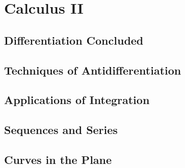 \part{Calculus II}

\clearpage{\pagestyle{empty}\cleardoublepage}
\chapter{Differentiation Concluded}\label{chapter:diff_conc}
\thispagestyle{empty}







\clearpage{\pagestyle{empty}\cleardoublepage}
\chapter{Techniques of Antidifferentiation}\label{chapter:anti_tech}
\thispagestyle{empty}







\clearpage{\pagestyle{empty}\cleardoublepage}
\chapter{Applications of Integration}\label{chapter:app_of_int}
\thispagestyle{empty}







\clearpage{\pagestyle{empty}\cleardoublepage}
\chapter{Sequences and Series}\label{chapter:sequences_series}
\thispagestyle{empty}










\clearpage{\pagestyle{empty}\cleardoublepage}
\chapter{Curves in the Plane}
\thispagestyle{empty}





